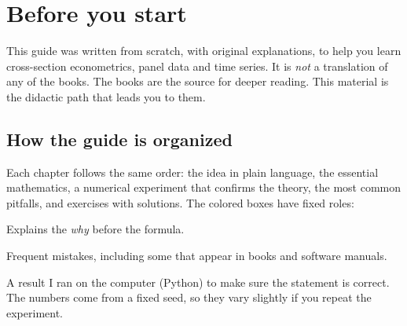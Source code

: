 \chapter*{Before you start}

This guide was written from scratch, with original explanations, to help you learn cross-section econometrics, panel data and time series. It is \emph{not} a translation of any of the books. The books are the source for deeper reading. This material is the didactic path that leads you to them.

\section*{How the guide is organized}
Each chapter follows the same order: the idea in plain language, the essential mathematics, a numerical experiment that confirms the theory, the most common pitfalls, and exercises with solutions. The colored boxes have fixed roles:

\begin{intuicao}[Intuition]
Explains the \emph{why} before the formula.
\end{intuicao}
\begin{atencao}[Pitfall]
Frequent mistakes, including some that appear in books and software manuals.
\end{atencao}
\begin{simulacao}
A result I ran on the computer (Python) to make sure the statement is correct. The numbers come from a fixed seed, so they vary slightly if you repeat the experiment.
\end{simulacao}

